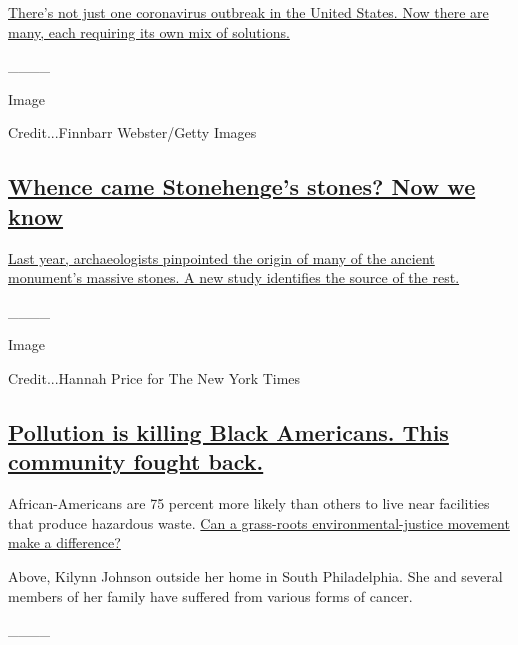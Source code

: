 \href{https://www.nytimes3xbfgragh.onion/2020/07/29/health/coronavirus-future-america.html}{There's
not just one coronavirus outbreak in the United States. Now there are
many, each requiring its own mix of solutions.}

\_\_\_\_

Image

Credit...Finnbarr Webster/Getty Images

\hypertarget{whence-came-stonehenges-stones-now-we-know}{%
\subsection{\texorpdfstring{\href{https://www.nytimes3xbfgragh.onion/2020/07/29/science/stonehenge-archaeology-sarsens.html}{Whence
came Stonehenge's stones? Now we
know}}{Whence came Stonehenge's stones? Now we know}}\label{whence-came-stonehenges-stones-now-we-know}}

\href{https://www.nytimes3xbfgragh.onion/2020/07/29/science/stonehenge-archaeology-sarsens.html}{Last
year, archaeologists pinpointed the origin of many of the ancient
monument's massive stones. A new study identifies the source of the
rest.}

\_\_\_\_

Image

Credit...Hannah Price for The New York Times

\hypertarget{pollution-is-killing-black-americans-this-community-fought-back}{%
\subsection{\texorpdfstring{\href{https://www.nytimes3xbfgragh.onion/2020/07/28/magazine/pollution-philadelphia-black-americans.html}{Pollution
is killing Black Americans. This community fought
back.}}{Pollution is killing Black Americans. This community fought back.}}\label{pollution-is-killing-black-americans-this-community-fought-back}}

African-Americans are 75 percent more likely than others to live near
facilities that produce hazardous waste.
\href{https://www.nytimes3xbfgragh.onion/2020/07/28/magazine/pollution-philadelphia-black-americans.html}{Can
a grass-roots environmental-justice movement make a difference?}

Above, Kilynn Johnson outside her home in South Philadelphia. She and
several members of her family have suffered from various forms of
cancer.

\_\_\_\_

